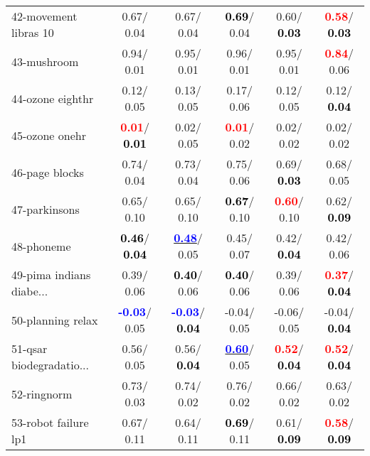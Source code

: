 \begin{table}[h]
\begin{center}
\begin{tabular}{lc|c|c|c|c}
42-movement libras 10 &   0.67/  0.04 &   0.67/  0.04 & \textcolor{black}{\textbf{  0.69}}/  0.04 &   0.60/\textcolor{black}{\textbf{  0.03}} & \textcolor{red}{\textbf{  0.58}}/\textcolor{black}{\textbf{  0.03}} \\
43-mushroom &   0.94/  0.01 &   0.95/  0.01 &   0.96/  0.01 &   0.95/  0.01 & \textcolor{red}{\textbf{  0.84}}/  0.06 \\
44-ozone eighthr &   0.12/  0.05 &   0.13/  0.05 &   0.17/  0.06 &   0.12/  0.05 &   0.12/\textcolor{black}{\textbf{  0.04}} \\
45-ozone onehr & \textcolor{red}{\textbf{  0.01}}/\textcolor{black}{\textbf{  0.01}} &   0.02/  0.05 & \textcolor{red}{\textbf{  0.01}}/  0.02 &   0.02/  0.02 &   0.02/  0.02 \\
46-page blocks &   0.74/  0.04 &   0.73/  0.04 &   0.75/  0.06 &   0.69/\textcolor{black}{\textbf{  0.03}} &   0.68/  0.05 \\ \hline
47-parkinsons &   0.65/  0.10 &   0.65/  0.10 & \textcolor{black}{\textbf{  0.67}}/  0.10 & \textcolor{red}{\textbf{  0.60}}/  0.10 &   0.62/\textcolor{black}{\textbf{  0.09}} \\
48-phoneme & \textcolor{black}{\textbf{  0.46}}/\textcolor{black}{\textbf{  0.04}} & \underline{\textcolor{blue}{\textbf{  0.48}}}/  0.05 &   0.45/  0.07 &   0.42/\textcolor{black}{\textbf{  0.04}} &   0.42/  0.06 \\
49-pima indians diabe... &   0.39/  0.06 & \textcolor{black}{\textbf{  0.40}}/  0.06 & \textcolor{black}{\textbf{  0.40}}/  0.06 &   0.39/  0.06 & \textcolor{red}{\textbf{  0.37}}/\textcolor{black}{\textbf{  0.04}} \\
50-planning relax & \textcolor{blue}{\textbf{ -0.03}}/  0.05 & \textcolor{blue}{\textbf{ -0.03}}/\textcolor{black}{\textbf{  0.04}} &  -0.04/  0.05 &  -0.06/  0.05 &  -0.04/\textcolor{black}{\textbf{  0.04}} \\
51-qsar biodegradatio... &   0.56/  0.05 &   0.56/\textcolor{black}{\textbf{  0.04}} & \underline{\textcolor{blue}{\textbf{  0.60}}}/  0.05 & \textcolor{red}{\textbf{  0.52}}/\textcolor{black}{\textbf{  0.04}} & \textcolor{red}{\textbf{  0.52}}/\textcolor{black}{\textbf{  0.04}} \\
52-ringnorm &   0.73/  0.03 &   0.74/  0.02 &   0.76/  0.02 &   0.66/  0.02 &   0.63/  0.02 \\
53-robot failure lp1 &   0.67/  0.11 &   0.64/  0.11 & \textcolor{black}{\textbf{  0.69}}/  0.11 &   0.61/\textcolor{black}{\textbf{  0.09}} & \textcolor{red}{\textbf{  0.58}}/\textcolor{black}{\textbf{  0.09}} \\ \hline

\end{tabular}
\end{center}
\end{table}
